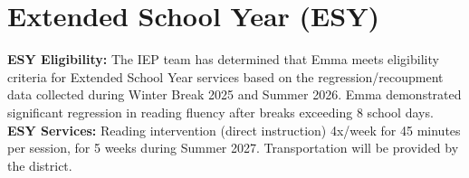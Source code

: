\section{Extended School Year (ESY)}

\begin{iepbox}
{\bfseries\color{IEPNavy} ESY Eligibility:} The IEP team has determined that Emma meets eligibility criteria for Extended School Year services based on the regression/recoupment data collected during Winter Break 2025 and Summer 2026. Emma demonstrated significant regression in reading fluency after breaks exceeding 8 school days.\\[4pt]
{\bfseries\color{IEPNavy} ESY Services:} Reading intervention (direct instruction) 4x/week for 45 minutes per session, for 5 weeks during Summer 2027. Transportation will be provided by the district.
\end{iepbox}

\vspace{10pt}
